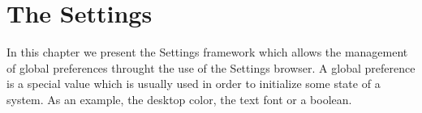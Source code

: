 \documentclass[a4paper,10pt,twoside]{book}
\begin{document}
\fi
\sloppy
\chapter{The Settings}

In this chapter we present the Settings framework which allows the management of global preferences throught the use of the Settings browser. A global preference is a special value which is usually used in order to initialize some state of a system. As an example, the desktop color, the text font or a boolean.

%
%
%
%
%
%
%
%
%
%
%
\end{document}

